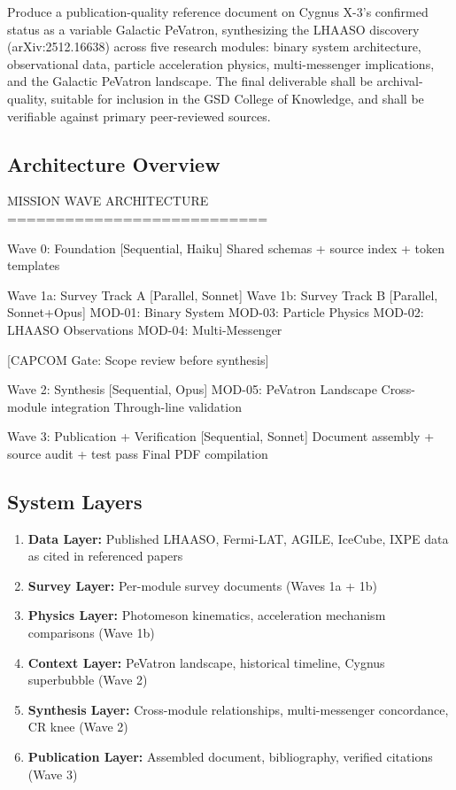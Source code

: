 \documentclass[11pt,letterpaper]{article}
\begin{document}
Produce a publication-quality reference document on Cygnus X-3's confirmed status as a variable Galactic PeVatron, synthesizing the LHAASO discovery (arXiv:2512.16638) across five research modules: binary system architecture, observational data, particle acceleration physics, multi-messenger implications, and the Galactic PeVatron landscape. The final deliverable shall be archival-quality, suitable for inclusion in the GSD College of Knowledge, and shall be verifiable against primary peer-reviewed sources.

\subsection{Architecture Overview}

\begin{asciibox}
MISSION WAVE ARCHITECTURE
===========================

Wave 0: Foundation [Sequential, Haiku]
  Shared schemas + source index + token templates

Wave 1a: Survey Track A [Parallel, Sonnet]      Wave 1b: Survey Track B [Parallel, Sonnet+Opus]
  MOD-01: Binary System                              MOD-03: Particle Physics
  MOD-02: LHAASO Observations                        MOD-04: Multi-Messenger

       [CAPCOM Gate: Scope review before synthesis]

Wave 2: Synthesis [Sequential, Opus]
  MOD-05: PeVatron Landscape
  Cross-module integration
  Through-line validation

Wave 3: Publication + Verification [Sequential, Sonnet]
  Document assembly + source audit + test pass
  Final PDF compilation
\end{asciibox}

\subsection{System Layers}

\begin{enumerate}
  \item \textbf{Data Layer:} Published LHAASO, Fermi-LAT, AGILE, IceCube, IXPE data as cited in referenced papers
  \item \textbf{Survey Layer:} Per-module survey documents (Waves 1a + 1b)
  \item \textbf{Physics Layer:} Photomeson kinematics, acceleration mechanism comparisons (Wave 1b)
  \item \textbf{Context Layer:} PeVatron landscape, historical timeline, Cygnus superbubble (Wave 2)
  \item \textbf{Synthesis Layer:} Cross-module relationships, multi-messenger concordance, CR knee (Wave 2)
  \item \textbf{Publication Layer:} Assembled document, bibliography, verified citations (Wave 3)
\end{enumerate}
\end{document}
